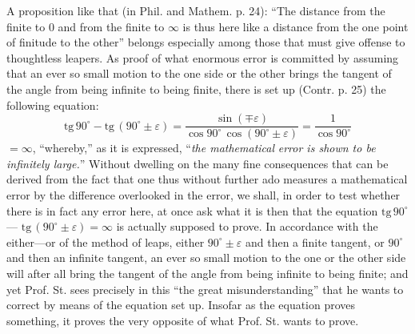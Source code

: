 \documentclass[12pt,a4paper,openany]{book}
\newcommand{\opage}[1]{\marginnote{\footnotesize\textit{[#1]}}}
\begin{document}
A proposition like that (in Phil. and Mathem. p. 24):
``The distance from the finite to $0$ and from the finite to $\infty$ is
thus here like a distance from the one point of finitude to
the other'' belongs especially among those that must give offense to thoughtless
leapers. As proof of what
enormous error is committed by assuming that an ever so small
motion to the one side or the other brings the tangent of the angle from being infinite to being finite, there is set up (Contr. p. 25) the following equation:
\[ \mathrm{tg}\,90^{\circ} - \mathrm{tg}\,(90^{\circ} \pm \varepsilon) = \frac{\sin (\mp \varepsilon)}{\cos 90^{\circ}\,\cos (90^{\circ}\pm\varepsilon)} = \frac{1}{\cos 90^{\circ}} \]
$= \infty$, ``whereby,'' as it is expressed, ``\emph{the mathematical}
\emph{error is shown to be infinitely large.}'' Without
dwelling on the many fine consequences that
can be derived from the fact that one thus without further ado measures a
mathematical error by the difference overlooked in the error, we shall, in order to test whether there is in fact any
error here, at once ask what it is then that the equation $\mathrm{tg}\,90^{\circ}$
--- $\mathrm{tg}\,(90^{\circ} \pm \varepsilon) = \infty$ is actually supposed to prove. In accordance with the either---or of the method of leaps, either $90^{\circ} \pm \varepsilon$
and then a finite tangent, or $90^{\circ}$ and then an infinite
tangent, an ever so small motion to the one or the
other side will after all bring the tangent of the angle from being
infinite to being finite; and yet Prof. St.
sees precisely in this ``the great misunderstanding'' that he wants to correct by means of the equation set up. Insofar as the equation proves
\opage{46}\setcounter{footnote}{0}%
something, it proves the very opposite of what Prof. St.
wants to prove.
\end{document}
